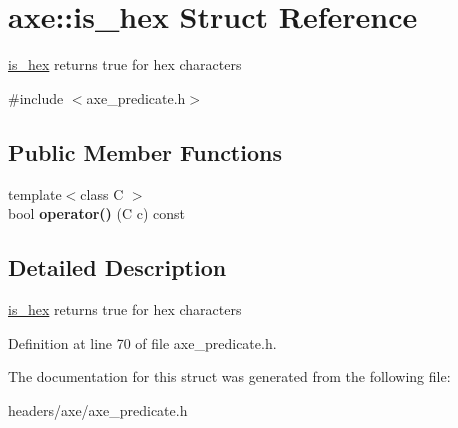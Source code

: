 \hypertarget{structaxe_1_1is__hex}{\section{axe\+:\+:is\+\_\+hex Struct Reference}
\label{structaxe_1_1is__hex}
}


\hyperlink{structaxe_1_1is__hex}{is\+\_\+hex} returns true for hex characters  




{\ttfamily \#include $<$axe\+\_\+predicate.\+h$>$}

\subsection*{Public Member Functions}
\begin{DoxyCompactItemize}
\item 
\hypertarget{structaxe_1_1is__hex_ab2bd4fbebceead6c183ceba757479e94}{{\footnotesize template$<$class C $>$ }\\bool {\bfseries operator()} (C c) const }\label{structaxe_1_1is__hex_ab2bd4fbebceead6c183ceba757479e94}

\end{DoxyCompactItemize}


\subsection{Detailed Description}
\hyperlink{structaxe_1_1is__hex}{is\+\_\+hex} returns true for hex characters 

Definition at line 70 of file axe\+\_\+predicate.\+h.



The documentation for this struct was generated from the following file\+:\begin{DoxyCompactItemize}
\item 
headers/axe/axe\+\_\+predicate.\+h\end{DoxyCompactItemize}
